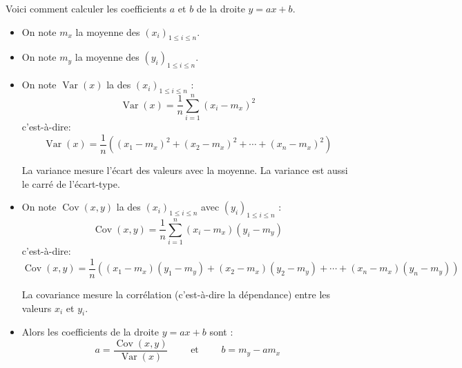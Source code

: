 \documentclass[11pt,class=report,crop=false]{standalone}
\begin{document}
\begin{cours}
Voici comment calculer les coefficients $a$ et $b$ de la droite $y=ax+b$.
\begin{itemize}
	\item On note $m_x$ la moyenne des $(x_i)_{1\le i \le n}$. 
	
	\item On note $m_y$ la moyenne des $(y_i)_{1\le i \le n}$. 	
	
	\item On note $\operatorname{Var}(x)$ la  des $(x_i)_{1\le i \le n}$ :
	$$\operatorname{Var}(x) = \frac{1}{n} \sum_{i=1}^{n}(x_i-m_x)^2$$
	c'est-à-dire:
	$$\operatorname{Var}(x) = \frac1n\left((x_1-m_x)^2 + (x_2-m_x)^2 + \cdots + (x_n-m_x)^2\right)$$
	
	La variance mesure l'écart des valeurs avec la moyenne.
	La variance est aussi le carré de l'écart-type.
	
	\item On note $\operatorname{Cov}(x,y)$ la  des $(x_i)_{1\le i \le n}$ avec $(y_i)_{1\le i \le n}$ :
	$$\operatorname{Cov}(x,y) = \frac{1}{n} \sum_{i=1}^{n}(x_i-m_x)(y_i-m_y)$$
	c'est-à-dire:
	$$\operatorname{Cov}(x,y) = \frac1n\left((x_1-m_x)(y_1-m_y) + (x_2-m_x)(y_2-m_y) + \cdots + (x_n-m_x)(y_n-m_y)\right)$$
	
	La covariance mesure la corrélation (c'est-à-dire la dépendance) entre les valeurs $x_i$ et $y_i$.
	
	\item Alors les coefficients de la droite $y=ax+b$ sont :
	$$a =  \frac{\operatorname{Cov}(x,y)}{\operatorname{Var}(x)}
	\qquad \text{ et } \qquad
	b = m_y - a m_x$$
	
\end{itemize}

	
\end{cours}


\end{document}
